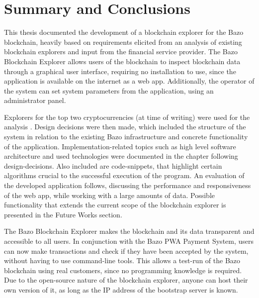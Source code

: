 \chapter{Summary and Conclusions}

This thesis documented the development of a blockchain explorer for the Bazo blockchain, heavily based on requirements elicited from an analysis of existing blockchain explorers and input from the financial service provider. The Bazo Blockchain Explorer allows users of the blockchain to inspect blockchain data through a graphical user interface, requiring no installation to use, since the application is available on the internet as a web app. Additionally, the operator of the system can set system parameters from the application, using an administrator panel. 

Explorers for the top two cryptocurrencies (at time of writing) were used for the analysis \cite{coinmarketcap}. Design decisions were then made, which included the structure of the system in relation to the existing Bazo infrastructure and concrete functionality of the application. Implementation-related topics such as high level software architecture and used technologies were documented in the chapter following design-decisions. Also included are code-snippets, that highlight certain algorithms crucial to the successful execution of the program. An evaluation of the developed application follows, discussing the performance and responsiveness of the web app, while working with a large amounts of data. Possible functionality that extends the current scope of the blockchain explorer is presented in the Future Works section.

The Bazo Blockchain Explorer makes the blockchain and its data transparent and accessible to all users. In conjunction with the Bazo PWA Payment System, users can now make transactions and check if they have been accepted by the system, without having to use command-line tools. This allows a test-run of the Bazo blockchain using real customers, since no programming knowledge is required. Due to the open-source nature of the blockchain explorer, anyone can host their own version of it, as long as the IP address of the bootstrap server is known.
